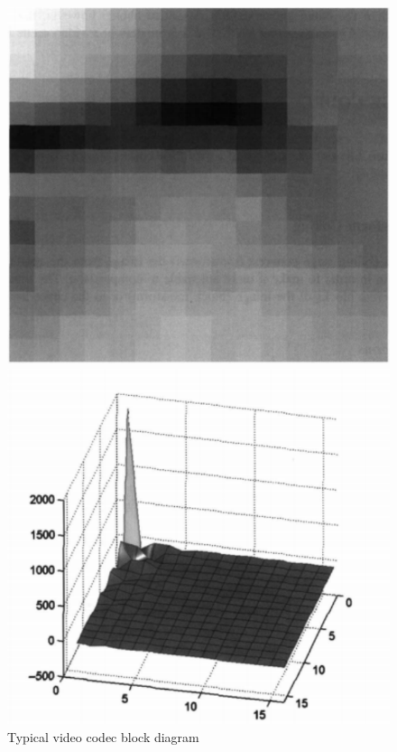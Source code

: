 \documentclass[a4paper,11pt,oneside]{article}
\begin{document}
\begin{figure}
  \centering
  \begin{flushleft}
    \includegraphics[scale = 0.4]{../figures/16x16_sample_image.pdf}
  \end{flushleft}

  \begin{flushright}
    \includegraphics[scale = 0.41]{../figures/16x16_sample_DCT.pdf}
  \end{flushright}

  \caption{Typical video codec block diagram\cite[p.~44]{richardson2002video}}
  \label{figure:DCT}
\end{figure}
\end{document}
